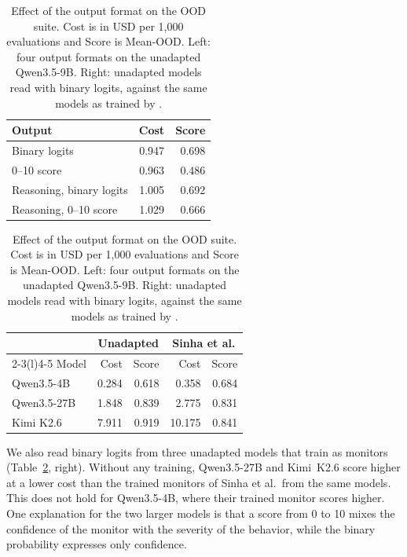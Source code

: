 \begin{table}[h]
\caption{Effect of the output format on the OOD suite. Cost is in USD per 1,000 evaluations and Score is Mean-OOD. Left: four output formats on the unadapted Qwen3.5-9B. Right: unadapted models read with binary logits, against the same models as trained by \citet{sinha2026training}.}
\label{tab:format}
\small
\setlength{\tabcolsep}{3pt}
\begin{minipage}[t]{0.40\textwidth}
\vspace{0pt}
\begin{tabular*}{\linewidth}{@{\extracolsep{\fill}}lrr@{}}
\toprule
Output & Cost & Score \\
\midrule
Binary logits & 0.947 & 0.698 \\
0--10 score & 0.963 & 0.486 \\
\addlinespace[\dimexpr\aboverulesep+\belowrulesep+\cmidrulewidth\relax]
Reasoning, binary logits & 1.005 & 0.692 \\
Reasoning, 0--10 score & 1.029 & 0.666 \\
\bottomrule
\end{tabular*}
\end{minipage}\hfill
\begin{minipage}[t]{0.56\textwidth}
\vspace{0pt}
\begin{tabular*}{\linewidth}{@{\extracolsep{\fill}}lrrrr@{}}
\toprule
 & \multicolumn{2}{c}{Unadapted} & \multicolumn{2}{c}{Sinha et al.} \\
\cmidrule(lr){2-3}\cmidrule(l){4-5}
Model & Cost & Score & Cost & Score \\
\midrule
Qwen3.5-4B & 0.284 & 0.618 & 0.358 & 0.684 \\
Qwen3.5-27B & 1.848 & 0.839 & 2.775 & 0.831 \\
Kimi K2.6 & 7.911 & 0.919 & 10.175 & 0.841 \\
\bottomrule
\end{tabular*}
\end{minipage}
\end{table}

We also read binary logits from three unadapted models that \citet{sinha2026training} train as monitors (Table~\ref{tab:format}, right).
Without any training, Qwen3.5-27B and Kimi~K2.6 score higher at a lower cost than the trained monitors of Sinha et al.\ from the same models.
This does not hold for Qwen3.5-4B, where their trained monitor scores higher.
One explanation for the two larger models is that a score from 0 to 10 mixes the confidence of the monitor with the severity of the behavior, while the binary probability expresses only confidence.

